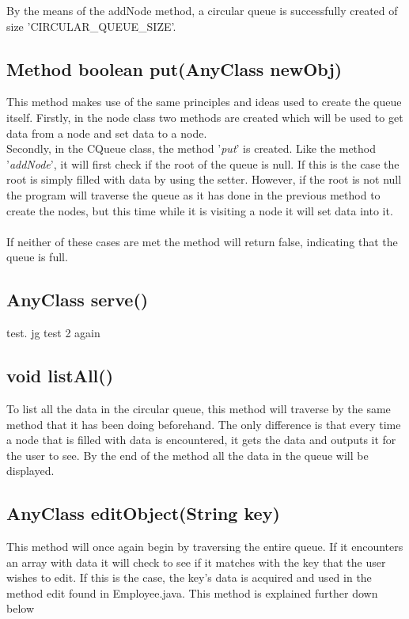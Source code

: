\documentclass[a4paper]{article}
\begin{document}
By the means of the addNode method, a circular queue is successfully created of size 'CIRCULAR\_QUEUE\_SIZE'.

\subsection{Method boolean put(AnyClass newObj)}
This method makes use of the same principles and ideas used to create the queue itself. Firstly, in the node class two methods are created which will be used to get data from a node and set data to a node.
\\Secondly, in the CQueue class, the method '\emph{put}' is created. Like the method '\emph{addNode}', it will first check if the root of the queue is null. If this is the case the root is simply filled with data by using the setter. However, if the root is not null the program will traverse the queue as it has done in the previous method to create the nodes, but this time while it is visiting a node it will set data into it.\\
\\If neither of these cases are met the method will return false, indicating that the queue is full.

\subsection{AnyClass serve()}
test. jg
test 2 again

\subsection{void listAll()}
To list all the data in the circular queue, this method will traverse by the same method that it has been doing beforehand. The only difference is that every time a node that is filled with data is encountered, it gets the data and outputs it for the user to see. By the end of the method all the data in the queue will be displayed.\\

\subsection{AnyClass editObject(String key)}
This method will once again begin by traversing the entire queue. If it encounters an array with data it will check to see if it matches with the key that the user wishes to edit. If this is the case, the key's data is acquired and used in the method edit found in Employee.java. This method is explained further down below
\bigskip
\end{document}
